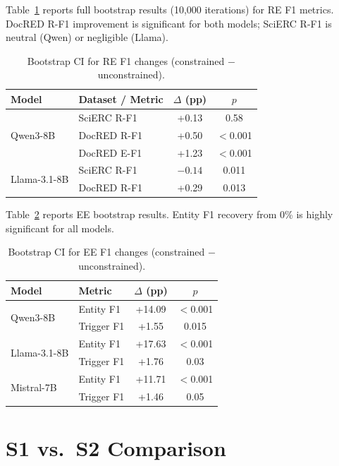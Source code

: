 \documentclass[11pt,a4paper]{article}
\begin{document}
Table~\ref{tab:bootstrap-re} reports full bootstrap results (10,000 iterations) for RE F1 metrics. DocRED R-F1 improvement is significant for both models; SciERC R-F1 is neutral (Qwen) or negligible (Llama).

\begin{table}[h]
\centering
\caption{Bootstrap CI for RE F1 changes (constrained $-$ unconstrained).}
\label{tab:bootstrap-re}
\small
\begin{tabular}{llcc}
\toprule
\textbf{Model} & \textbf{Dataset / Metric} & $\Delta$ (pp) & $p$ \\
\midrule
\multirow{3}{*}{Qwen3-8B}
& SciERC R-F1 & +0.13 & 0.58 \\
& DocRED R-F1 & +0.50 & $<$0.001 \\
& DocRED E-F1 & +1.23 & $<$0.001 \\
\midrule
\multirow{2}{*}{Llama-3.1-8B}
& SciERC R-F1 & $-0.14$ & 0.011 \\
& DocRED R-F1 & +0.29 & 0.013 \\
\bottomrule
\end{tabular}
\end{table}

Table~\ref{tab:bootstrap-ee} reports EE bootstrap results. Entity F1 recovery from 0\% is highly significant for all models.

\begin{table}[h]
\centering
\caption{Bootstrap CI for EE F1 changes (constrained $-$ unconstrained).}
\label{tab:bootstrap-ee}
\small
\begin{tabular}{llcc}
\toprule
\textbf{Model} & \textbf{Metric} & $\Delta$ (pp) & $p$ \\
\midrule
\multirow{2}{*}{Qwen3-8B}
& Entity F1 & +14.09 & $<$0.001 \\
& Trigger F1 & +1.55 & 0.015 \\
\midrule
\multirow{2}{*}{Llama-3.1-8B}
& Entity F1 & +17.63 & $<$0.001 \\
& Trigger F1 & +1.76 & 0.03 \\
\midrule
\multirow{2}{*}{Mistral-7B}
& Entity F1 & +11.71 & $<$0.001 \\
& Trigger F1 & +1.46 & 0.05 \\
\bottomrule
\end{tabular}
\end{table}

\section{S1 vs.\ S2 Comparison}
\label{app:s2}
\end{document}
